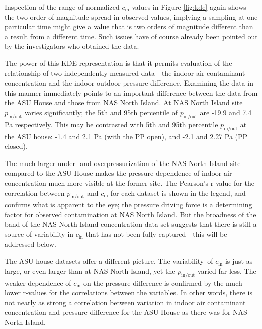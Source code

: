 \documentclass[journal=esthag,manuscript=article]{achemso}
\begin{document}
Inspection of the range of normalized $c_\mathrm{in}$ values in Figure \ref{fig:kde} again shows the two order of magnitude spread in observed values, implying a sampling at one particular time might give a value that is two orders of magnitude different than a result from a different time.
Such issues have of course already been pointed out by the investigators who obtained the data.\par

The power of this KDE representation is that it permits evaluation of the relationship of two independently measured data - the indoor air contaminant concentration and the indoor-outdoor pressure difference.
Examining the data in this manner immediately points to an important difference between the data from the ASU House and those from NAS North Island.
At NAS North Island site $p_\mathrm{in/out}$ varies significantly; the 5th and 95th percentile of $p_\mathrm{in/out}$ are -19.9 and 7.4 Pa respectively.
This may be contrasted with 5th and 95th percentile $p_\mathrm{in/out}$ at the ASU house: -1.4 and 2.1 Pa (with the PP open), and -2.1 and 2.27 Pa (PP closed).\par

The much larger under- and overpressurization of the NAS North Island site compared to the ASU House makes the pressure dependence of indoor air concentration much more visible at the former site.
The Pearson’s r-value for the correlation between $p_\mathrm{in/out}$ and $c_\mathrm{in}$ for each dataset is shown in the legend, and confirms what is apparent to the eye; the pressure driving force is a determining factor for observed contamination at NAS North Island.
But the broadness of the band of the NAS North Island concentration data set suggests that there is still a source of variability in $c_\mathrm{in}$ that has not been fully captured - this will be addressed below.\par

The ASU house datasets offer a different picture.
The variability of $c_\mathrm{in}$ is just as large, or even larger than at NAS North Island, yet the $p_\mathrm{in/out}$ varied far less.
The weaker dependence of $c_\mathrm{in}$ on the pressure difference is confirmed by the much lower r-values for the correlations between the variables.
In other words, there is not nearly as strong a correlation between variation in indoor air contaminant concentration and pressure difference for the ASU House as there was for NAS North Island.\par
\end{document}
